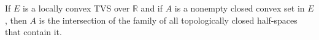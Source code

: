 If $E$ is a locally convex TVS over $\mathbb{R}$ and if $A$ is a nonempty closed convex set in $E$, then $A$ is the intersection of the family of all topologically closed half-spaces that contain it.